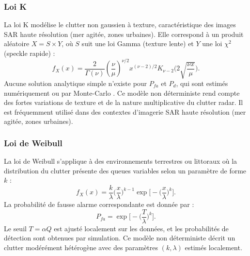 
\subsubsection{Loi K}

La loi K modélise le clutter non gaussien à texture, caractéristique des images SAR haute résolution (mer agitée, zones urbaines).  
Elle correspond à un produit aléatoire $X = S \times Y$, où $S$ suit une loi Gamma (texture lente) et $Y$ une loi $\chi^2$ (speckle rapide) :
\begin{equation}
f_X(x)=\frac{2}{\Gamma(\nu)}\left(\frac{\nu}{\mu}\right)^{\nu/2} x^{(\nu-2)/2} K_{\nu-2}\!\Big(2\sqrt{\frac{\nu x}{\mu}}\Big).
\end{equation}
Aucune solution analytique simple n’existe pour $P_{fa}$ et $P_d$, qui sont estimés numériquement ou par Monte-Carlo \cite{habib2008, schukin2008}.  
Ce modèle non déterministe rend compte des fortes variations de texture et de la nature multiplicative du clutter radar. Il est fréquemment utilisé dans des contextes d'imagerie SAR haute résolution (mer agitée, zones urbaines).


\subsubsection{Loi de Weibull}

La loi de Weibull s’applique à des environnements terrestres ou littoraux où la distribution du clutter présente des queues variables selon un paramètre de forme $k$ :
\begin{equation}
f_X(x)=\frac{k}{\lambda}\Big(\frac{x}{\lambda}\Big)^{k-1}\exp\!\Big[-\Big(\frac{x}{\lambda}\Big)^k\Big].
\end{equation}
La probabilité de fausse alarme correspondante est donnée par \cite{el_darymli2018, skolnik2001} :
\begin{equation}
P_{fa} = \exp\!\Big[-\Big(\frac{T}{\lambda}\Big)^k\Big].
\end{equation}
Le seuil $T = \alpha Q$ est ajusté localement sur les données, et les probabilités de détection sont obtenues par simulation.  
Ce modèle non déterministe décrit un clutter modérément hétérogène avec des paramètres $(k, \lambda)$ estimés localement.

